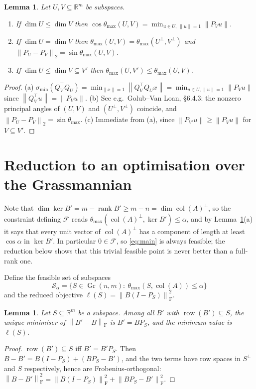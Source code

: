 \documentclass[11pt]{article}
\newtheorem{lemma}[theorem]{Lemma}
\theoremstyle{definition}
\newcommand{\R}{\mathbb{R}}
\newcommand{\col}{\operatorname{col}}
\newcommand{\row}{\operatorname{row}}
\newcommand{\rank}{\operatorname{rank}}
\newcommand{\Gr}{\operatorname{Gr}}
\newcommand{\norm}[1]{\left\lVert #1 \right\rVert}
\newcommand{\Fro}{\mathrm{F}}
\newcommand{\Sf}{\mathcal{S}}
\newcommand{\Ff}{\mathcal{F}}
\begin{document}
\begin{lemma}\label{lem:facts}
Let $U,V\subseteq\R^m$ be subspaces.
\begin{enumerate}
\item[(a)] If $\dim U\le\dim V$ then $\cos\theta_{\max}(U,V)=\min_{u\in U,\ \norm u=1}\norm{P_V u}$.
\item[(b)] If $\dim U=\dim V$ then $\theta_{\max}(U,V)=\theta_{\max}(U^\perp,V^\perp)$ and $\norm{P_U-P_V}_2=\sin\theta_{\max}(U,V)$.
\item[(c)] If $\dim U\le \dim V\subseteq V'$ then $\theta_{\max}(U,V')\le\theta_{\max}(U,V)$.
\end{enumerate}
\end{lemma}
\begin{proof}
(a) $\sigma_{\min}(Q_V^\top Q_U)=\min_{\norm x=1}\norm{Q_V^\top Q_U x}=\min_{u\in U,\norm u=1}\norm{P_V u}$ since $\norm{Q_V^\top u}=\norm{P_V u}$.
(b) See e.g.\ Golub--Van Loan, \S6.4.3: the nonzero principal angles of $(U,V)$ and $(U^\perp,V^\perp)$ coincide, and $\norm{P_U-P_V}_2=\sin\theta_{\max}$.
(c) Immediate from (a), since $\norm{P_{V'}u}\ge\norm{P_V u}$ for $V\subseteq V'$.
\end{proof}

\section{Reduction to an optimisation over the Grassmannian}

Note that $\dim\ker B'=m-\rank B'\ge m-n=\dim\col(A)^\perp$, so the constraint defining $\Ff$ reads
$\theta_{\max}(\col(A)^\perp,\ker B')\le\alpha$, and by Lemma~\ref{lem:facts}(a) it says that
every unit vector of $\col(A)^\perp$ has a component of length at least $\cos\alpha$ in $\ker B'$.
In particular $0\in\Ff$, so \eqref{eq:main} is always feasible; the reduction below shows that this trivial feasible point is never better than a full-rank one.

Define the feasible set of subspaces
\begin{equation}
  \Sf_\alpha=\{S\in\Gr(n,m):\ \theta_{\max}(S,\col(A))\le\alpha\}
\end{equation}
and the reduced objective $\ell(S)=\norm{B(I-P_S)}_\Fro^2$.

\begin{lemma}\label{lem:fixedS}
Let $S\subseteq\R^m$ be a subspace. Among all $B'$ with $\row(B')\subseteq S$, the unique minimiser of $\norm{B'-B}_\Fro$ is $B'=BP_S$, and the minimum value is $\ell(S)$.
\end{lemma}
\begin{proof}
$\row(B')\subseteq S$ iff $B'=B'P_S$. Then $B-B'=B(I-P_S)+(BP_S-B')$, and the two terms have row spaces in $S^\perp$ and $S$ respectively, hence are Frobenius-orthogonal:
$\norm{B-B'}_\Fro^2=\norm{B(I-P_S)}_\Fro^2+\norm{BP_S-B'}_\Fro^2$.
\end{proof}
\end{document}
